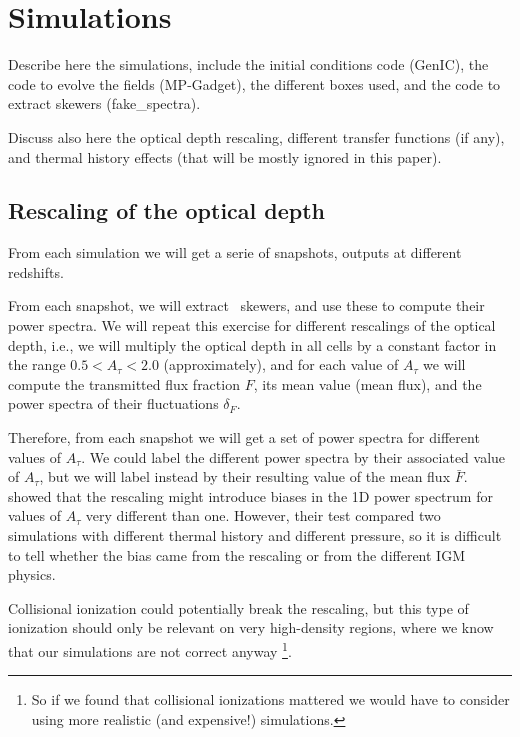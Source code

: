 \section{Simulations}
\label{sec:sims}

Describe here the simulations, include the initial conditions code (GenIC),
the code to evolve the fields (MP-Gadget), the different boxes used,
and the code to extract skewers (fake\_spectra).

Discuss also here the optical depth rescaling, different transfer functions
(if any), and thermal history effects (that will be mostly ignored in this
paper).


\subsection{Rescaling of the optical depth}

From each simulation we will get a serie of snapshots, outputs at different
redshifts. 

From each snapshot, we will extract \lya\ skewers, and use these to compute
their power spectra.
We will repeat this exercise for different rescalings of the optical depth,
i.e., we will multiply the optical depth in all cells by a constant factor
in the range $0.5 < A_\tau < 2.0$ (approximately), and for each value of
$A_\tau$ we will compute the transmitted flux fraction $F$, its mean value
(mean flux), and the power spectra of their fluctuations $\delta_F$.

Therefore, from each snapshot we will get a set of power spectra for different
values of $A_\tau$.
We could label the different power spectra by their associated value of
$A_\tau$, but we will label instead by their resulting value of the mean
flux $\bar F$.
\cite{Lukic2015} showed that the rescaling might introduce biases in the
1D power spectrum for values of $A_\tau$ very different than one.
However, their test compared two simulations with different thermal history
and different pressure, so it is difficult to tell whether the bias came
from the rescaling or from the different IGM physics.

Collisional ionization could potentially break the rescaling, but this type
of ionization should only be relevant on very high-density regions,
where we know that our simulations are not correct anyway
\footnote{So if we found that collisional ionizations mattered we would
have to consider using more realistic (and expensive!) simulations.}.

